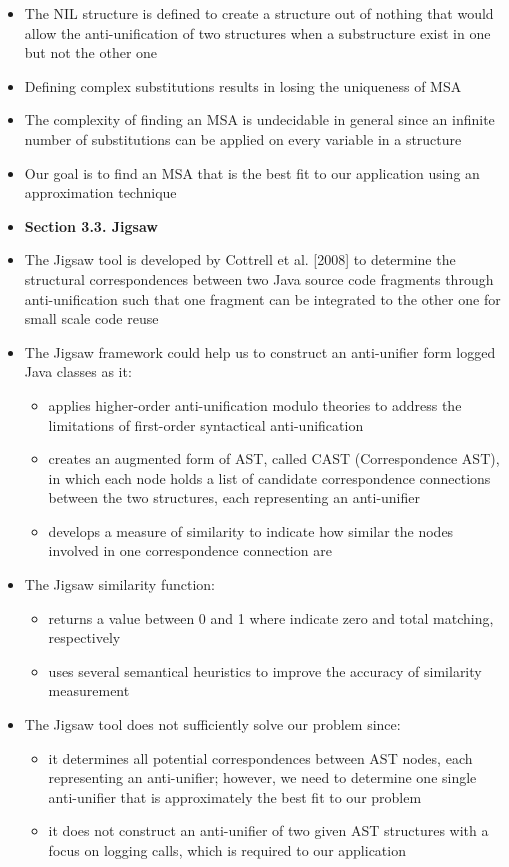 \documentclass{article}
\newcommand{\bold}{\textbf}
\begin{document}
\begin{itemize} [leftmargin=.1in]
\item The NIL structure is defined to create a structure out of nothing that would allow the anti-unification of two structures when a substructure exist in one but not the other one

\item Defining complex substitutions results in losing the uniqueness of MSA
\item The complexity of finding an MSA is undecidable in general since an infinite number of substitutions can be applied on every variable in a structure
\item Our goal is to find an MSA that is the best fit to our application using an approximation technique

\item \bold{Section 3.3. Jigsaw}
\item The Jigsaw tool is developed by Cottrell et al. [2008] to determine the structural correspondences between two Java source code fragments through anti-unification such that one fragment can be integrated to the other one for small scale code reuse
\item The Jigsaw framework could help us to construct an anti-unifier form logged Java classes as it:
\begin{itemize}
\item applies higher-order anti-unification modulo theories to address the limitations of first-order syntactical anti-unification
\item creates an augmented form of AST, called CAST (Correspondence AST), in which each node holds a list of candidate correspondence connections between the two structures, each representing an anti-unifier
\item develops a measure of similarity to indicate how similar the nodes involved in one correspondence connection are

\end{itemize}
\item The Jigsaw similarity function:
\begin{itemize}
\item returns a value between 0 and 1 where indicate zero and total matching, respectively
\item uses several semantical heuristics to improve the accuracy of similarity measurement

\end{itemize}

\item The Jigsaw tool does not sufficiently solve our problem since:
\begin{itemize}
\item it determines all potential correspondences between AST nodes, each representing an anti-unifier; however, we need to determine one single anti-unifier that is approximately the best fit to our problem
\item it does not construct an anti-unifier of two given AST structures with a focus on logging calls, which is required to our application
\end{itemize}



\end{itemize}
\end{document}
